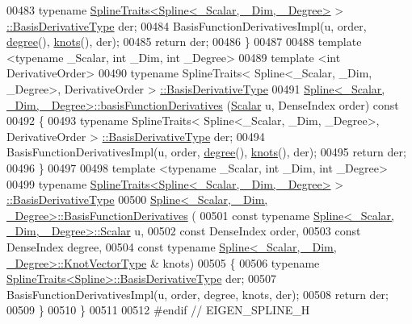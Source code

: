 \begin{DoxyCode}
00483     \textcolor{keyword}{typename} \hyperlink{struct_eigen_1_1_spline_traits}{SplineTraits<Spline<\_Scalar, \_Dim, \_Degree>} >
      \hyperlink{group___splines___module_a9db0b0108353660cd03524f2e67d6b3c}{::BasisDerivativeType} der;
00484     BasisFunctionDerivativesImpl(u, order, \hyperlink{group___splines___module_a0df23e941ac0f31dcd095a4dd4f4a7ec}{degree}(), \hyperlink{group___splines___module_ae3eac8af580ad880d8ad3a259d453aa1}{knots}(), der);
00485     \textcolor{keywordflow}{return} der;
00486   \}
00487 
00488   \textcolor{keyword}{template} <\textcolor{keyword}{typename} \_Scalar, \textcolor{keywordtype}{int} \_Dim, \textcolor{keywordtype}{int} \_Degree>
00489   \textcolor{keyword}{template} <\textcolor{keywordtype}{int} DerivativeOrder>
00490   \textcolor{keyword}{typename} SplineTraits< Spline<\_Scalar, \_Dim, \_Degree>, DerivativeOrder >
      \hyperlink{group___splines___module_a9db0b0108353660cd03524f2e67d6b3c}{::BasisDerivativeType}
00491     \hyperlink{group___splines___module_a17d416e814d1ee957e5b309dc423751f}{Spline<\_Scalar, \_Dim, \_Degree>::basisFunctionDerivatives}
      (\hyperlink{group___splines___module_a8cafd78b564825c76fbb3419653d9742}{Scalar} u, DenseIndex order)\textcolor{keyword}{ const}
00492 \textcolor{keyword}{  }\{
00493     \textcolor{keyword}{typename} SplineTraits< Spline<\_Scalar, \_Dim, \_Degree>, DerivativeOrder >
      \hyperlink{group___splines___module_a9db0b0108353660cd03524f2e67d6b3c}{::BasisDerivativeType} der;
00494     BasisFunctionDerivativesImpl(u, order, \hyperlink{group___splines___module_a0df23e941ac0f31dcd095a4dd4f4a7ec}{degree}(), \hyperlink{group___splines___module_ae3eac8af580ad880d8ad3a259d453aa1}{knots}(), der);
00495     \textcolor{keywordflow}{return} der;
00496   \}
00497 
00498   \textcolor{keyword}{template} <\textcolor{keyword}{typename} \_Scalar, \textcolor{keywordtype}{int} \_Dim, \textcolor{keywordtype}{int} \_Degree>
00499   \textcolor{keyword}{typename} \hyperlink{struct_eigen_1_1_spline_traits}{SplineTraits<Spline<\_Scalar, \_Dim, \_Degree>} >
      \hyperlink{group___splines___module_a9db0b0108353660cd03524f2e67d6b3c}{::BasisDerivativeType}
00500   \hyperlink{group___splines___module_a2e42e79b08b560007062b8f56689ae24}{Spline<\_Scalar, \_Dim, \_Degree>::BasisFunctionDerivatives}
      (
00501     \textcolor{keyword}{const} \textcolor{keyword}{typename} \hyperlink{group___splines___module_a8cafd78b564825c76fbb3419653d9742}{Spline<\_Scalar, \_Dim, \_Degree>::Scalar} u,
00502     \textcolor{keyword}{const} DenseIndex order,
00503     \textcolor{keyword}{const} DenseIndex degree,
00504     \textcolor{keyword}{const} \textcolor{keyword}{typename} \hyperlink{group___splines___module_a066f7a8b120316c9068b559f0790e9ec}{Spline<\_Scalar, \_Dim, \_Degree>::KnotVectorType}
      & knots)
00505   \{
00506     \textcolor{keyword}{typename} \hyperlink{struct_eigen_1_1_spline_traits}{SplineTraits<Spline>::BasisDerivativeType} der;
00507     BasisFunctionDerivativesImpl(u, order, degree, knots, der);
00508     \textcolor{keywordflow}{return} der;
00509   \}
00510 \}
00511 
00512 \textcolor{preprocessor}{#endif // EIGEN\_SPLINE\_H}
\end{DoxyCode}
